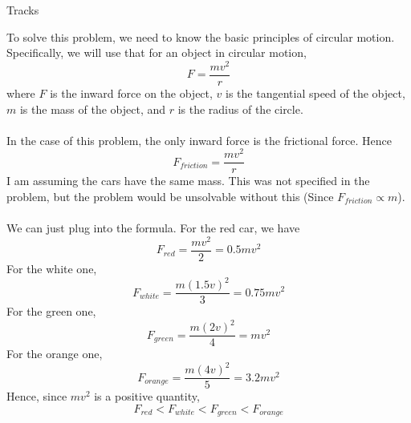 \documentclass[11pt]{scrartcl}
\begin{document}
\begin{example}
  Tracks
\end{example}
\begin{soln}
  To solve this problem, we need to know the basic principles of circular motion.
  Specifically, we will use that for an object in circular motion,
  $$F=\frac{mv^2}{r}$$
  where $F$ is the inward force on the object, $v$ is the tangential speed of the object, $m$
  is the mass of the object, and $r$ is the radius of the circle.
  \\ \\
  In the case of this problem, the only inward force is the frictional force. Hence
  $$F_{friction}=\frac{mv^2}{r}$$
  I am assuming the cars have the same mass. This was not specified in the problem, but the problem
  would be unsolvable without this (Since $F_{friction}\propto m$).
  \\ \\
  We can just plug into the formula. For the red car, we have
  $$F_{red}=\frac{mv^2}{2}=0.5mv^2$$
  For the white one,
  $$F_{white}=\frac{m(1.5v)^2}{3}=0.75mv^2$$
  For the green one,
  $$F_{green}=\frac{m(2v)^2}{4}=mv^2$$
  For the orange one,
  $$F_{orange}=\frac{m(4v)^2}{5}=3.2mv^2$$
  Hence, since $mv^2$ is a positive quantity,
  $$\boxed{F_{red}<F_{white}<F_{green}<F_{orange}}$$
\end{soln}
\end{document}
